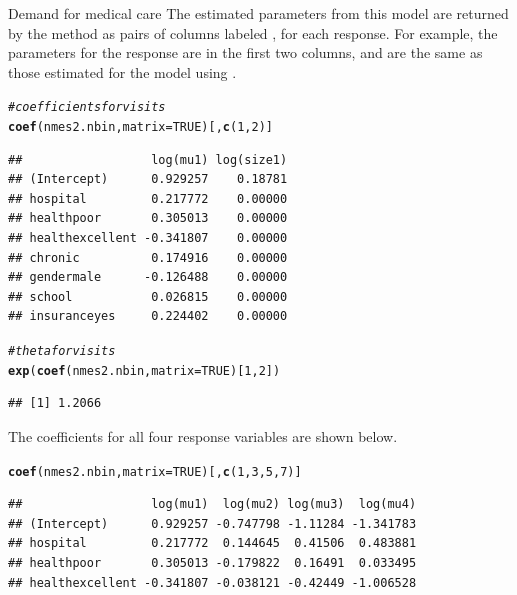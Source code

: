 \documentclass[11pt]{book}\usepackage[]{graphicx}\usepackage[]{color}
\makeatletter
\newcommand{\hlnum}[1]{\textcolor[rgb]{0.686,0.059,0.569}{#1}}%
\newcommand{\hlcom}[1]{\textcolor[rgb]{0.678,0.584,0.686}{\textit{#1}}}%
\newcommand{\hlstd}[1]{\textcolor[rgb]{0.345,0.345,0.345}{#1}}%
\newcommand{\hlkwc}[1]{\textcolor[rgb]{0.333,0.667,0.333}{#1}}%
\newcommand{\hlkwd}[1]{\textcolor[rgb]{0.737,0.353,0.396}{\textbf{#1}}}%
\newenvironment{kframe}{%
 \def\at@end@of@kframe{}%
 \ifinner\ifhmode%
  \def\at@end@of@kframe{\end{minipage}}%
  \begin{minipage}{\columnwidth}%
 \fi\fi%
 \def\FrameCommand##1{\hskip\@totalleftmargin \hskip-\fboxsep
 \colorbox{shadecolor}{##1}\hskip-\fboxsep
     \hskip-\linewidth \hskip-\@totalleftmargin \hskip\columnwidth}%
 \MakeFramed {\advance\hsize-\width
   \@totalleftmargin\z@ \linewidth\hsize
   \@setminipage}}%
 {\par\unskip\endMakeFramed%
 \at@end@of@kframe}
\newenvironment{knitrout}{}{} %
\renewenvironment{knitrout}{\small\renewcommand{\baselinestretch}{.85}}{} %
\makeatother
\begin{document}
\begin{Example}[nmes5]{Demand for medical care}
The estimated parameters from this model are returned by the  method as pairs of
columns labeled ,  for each response.
For example, the parameters for the  response are in the first two columns,
and are the same as those estimated for the model  using .
\begin{knitrout}
\color{fgcolor}\begin{kframe}
\begin{alltt}
\hlcom{# coefficients for visits}
\hlkwd{coef}\hlstd{(nmes2.nbin,} \hlkwc{matrix}\hlstd{=}\hlnum{TRUE}\hlstd{)[,}\hlkwd{c}\hlstd{(}\hlnum{1}\hlstd{,}\hlnum{2}\hlstd{)]}
\end{alltt}
\begin{verbatim}
##                  log(mu1) log(size1)
## (Intercept)      0.929257    0.18781
## hospital         0.217772    0.00000
## healthpoor       0.305013    0.00000
## healthexcellent -0.341807    0.00000
## chronic          0.174916    0.00000
## gendermale      -0.126488    0.00000
## school           0.026815    0.00000
## insuranceyes     0.224402    0.00000
\end{verbatim}
\begin{alltt}
\hlcom{# theta for visits}
\hlkwd{exp}\hlstd{(}\hlkwd{coef}\hlstd{(nmes2.nbin,} \hlkwc{matrix}\hlstd{=}\hlnum{TRUE}\hlstd{)[}\hlnum{1}\hlstd{,}\hlnum{2}\hlstd{])}
\end{alltt}
\begin{verbatim}
## [1] 1.2066
\end{verbatim}
\end{kframe}
\end{knitrout}
The  coefficients for all four response variables are shown below.
\begin{knitrout}
\color{fgcolor}\begin{kframe}
\begin{alltt}
\hlkwd{coef}\hlstd{(nmes2.nbin,} \hlkwc{matrix}\hlstd{=}\hlnum{TRUE}\hlstd{)[,}\hlkwd{c}\hlstd{(}\hlnum{1}\hlstd{,}\hlnum{3}\hlstd{,}\hlnum{5}\hlstd{,}\hlnum{7}\hlstd{)]}
\end{alltt}
\begin{verbatim}
##                  log(mu1)  log(mu2) log(mu3)  log(mu4)
## (Intercept)      0.929257 -0.747798 -1.11284 -1.341783
## hospital         0.217772  0.144645  0.41506  0.483881
## healthpoor       0.305013 -0.179822  0.16491  0.033495
## healthexcellent -0.341807 -0.038121 -0.42449 -1.006528

\end{verbatim}
\end{kframe}
\end{knitrout}
\end{Example}
\end{document}
